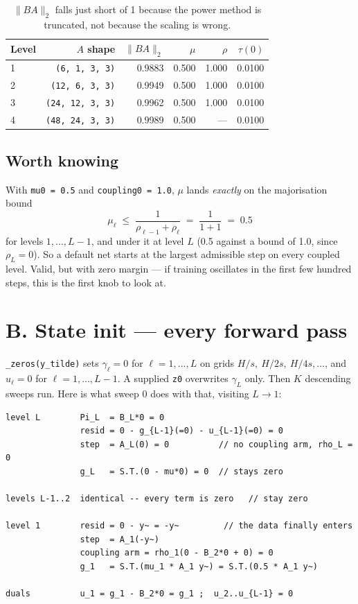 \documentclass[11pt]{article}
\begin{document}
\begin{table}[h]\centering\small
\begin{tabular}{lrrrrr}
\toprule
Level & $A$ shape & $\|B A\|_2$ & $\mu$ & $\rho$ & $\tau(0)$ \\
\midrule
1 & \texttt{(6, 1, 3, 3)}   & 0.9883 & 0.500 & 1.000 & 0.0100 \\
2 & \texttt{(12, 6, 3, 3)}  & 0.9949 & 0.500 & 1.000 & 0.0100 \\
3 & \texttt{(24, 12, 3, 3)} & 0.9962 & 0.500 & 1.000 & 0.0100 \\
4 & \texttt{(48, 24, 3, 3)} & 0.9989 & 0.500 & ---   & 0.0100 \\
\bottomrule
\end{tabular}
\caption*{\footnotesize $\|BA\|_2$ falls just short of 1 because the power method is truncated, not because
the scaling is wrong.}
\end{table}

\subsection*{Worth knowing}

With \texttt{mu0 = 0.5} and \texttt{coupling0 = 1.0}, $\mu$ lands \emph{exactly} on the majorisation bound
\[
  \mu_\ell \;\le\; \frac{1}{\rho_{\ell-1} + \rho_\ell} \;=\; \frac{1}{1+1} \;=\; 0.5
\]
for levels $1,\dots,L-1$, and under it at level $L$ (0.5 against a bound of 1.0, since $\rho_L = 0$). So a
default net starts at the largest admissible step on every coupled level. Valid, but with zero margin --- if
training oscillates in the first few hundred steps, this is the first knob to look at.

\section*{B. State init --- every forward pass}

\texttt{\_zeros(y\_tilde)} sets $\gamma_\ell = 0$ for $\ell = 1,\dots,L$ on grids $H/s,\ H/2s,\ H/4s,\dots$,
and $u_\ell = 0$ for $\ell = 1,\dots,L-1$. A supplied \texttt{z0} overwrites $\gamma_L$ only. Then $K$
descending sweeps run. Here is what sweep 0 does with that, visiting $L \to 1$:

\begin{lstlisting}
level L        Pi_L  = B_L*0 = 0
               resid = 0 - g_{L-1}(=0) - u_{L-1}(=0) = 0
               step  = A_L(0) = 0          // no coupling arm, rho_L = 0
               g_L   = S.T.(0 - mu*0) = 0  // stays zero

levels L-1..2  identical -- every term is zero   // stay zero

level 1        resid = 0 - y~ = -y~         // the data finally enters
               step  = A_1(-y~)
               coupling arm = rho_1(0 - B_2*0 + 0) = 0
               g_1   = S.T.(mu_1 * A_1 y~) = S.T.(0.5 * A_1 y~)

duals          u_1 = g_1 - B_2*0 = g_1 ;  u_2..u_{L-1} = 0
\end{lstlisting}
\end{document}
